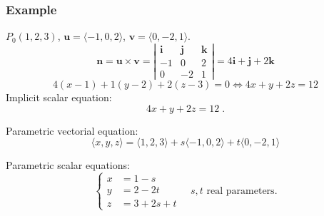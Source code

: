\begin{frame}
\begin{columns}
{\begin{figure}
    \end{figure}}
\end{columns}
\end{frame}


\begin{frame}
 \frametitle{Example}

$P_0(1,2,3)$, $\textbf{u}=\langle -1,0,2\rangle$, $\textbf{v} = \langle 0,-2,1\rangle$.\pause
%
$$\textbf{n} = \textbf{u} \times \textbf{v} = \left| \begin{array}{ccc}
                           \textbf{i} & \textbf{j} & \textbf{k} \\
			   -1 & 0 & 2 \\
                           0 & -2 & 1
                          \end{array}
\right| = 4\textbf{i}+\textbf{j} +2\textbf{k}$$
%
$$4(x-1)+1(y-2) + 2(z-3) = 0 \Longleftrightarrow 4x+y+2z = 12$$
%
\pause Implicit scalar equation:
%
$$4x+y+2z = 12\; .$$

\pause Parametric vectorial equation:
%
$$\langle x, y, z \rangle = \langle 1,2,3\rangle + s\langle -1, 0, 2\rangle + t\langle 0,-2,1\rangle$$

\pause Parametric scalar equations:
%
$$\left\{ \begin{array}{ll}
           x & = 1 -s \\
           y & = 2-2t \\
           z & = 3 +2s +t
          \end{array}
\right. \quad s,t \text{ real parameters}.$$
%
\end{frame}


